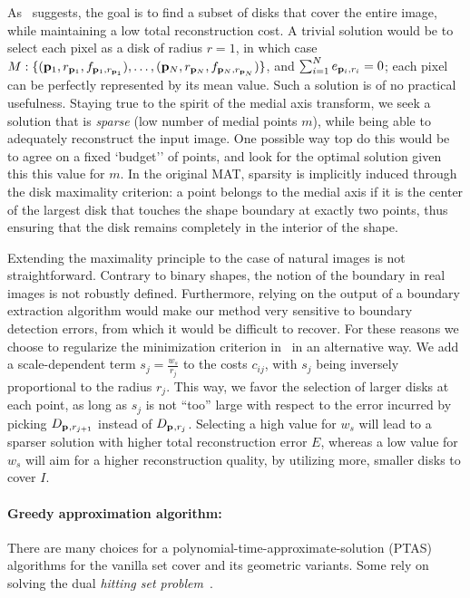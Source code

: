 \documentclass[10pt,twocolumn,letterpaper]{article}
\begin{document}
As~ suggests, the goal is to find a subset of disks that cover the entire image, while maintaining
a low total reconstruction cost. 
A trivial solution would be to select each pixel as a disk of radius $r=1$, in which case
$M:\{ (\mathbf{p}_{1},r_{\mathbf{p}_{1}},f_{\mathbf{p}_{1},r_{\mathbf{p}_{1}}}), \ldots, ( \mathbf{p}_{N},r_{\mathbf{p}_{N}},f_{\mathbf{p}_{N},r_{\mathbf{p}_{N}}} ) \}$,
and $\sum_{i=1}^N e_{\mathbf{p}_{i},r_i} = 0$; each pixel can be perfectly represented by its mean value.
Such a solution is of no practical usefulness. 
Staying true to the spirit of the medial axis transform, we seek a solution that is \emph{sparse}
(low number of medial points $m$), while being able to adequately reconstruct the input image.
One possible way top do this would be to agree on a fixed `budget'' of points, and look for the 
optimal solution given this this value for $m$.
In the original MAT, sparsity is implicitly induced through the disk maximality criterion:
a point belongs to the medial axis if it is the center of the largest disk that touches 
the shape boundary at exactly two points, thus ensuring that the disk remains completely in the 
interior of the shape.

Extending the maximality principle to the case of natural images is not straightforward.
Contrary to binary shapes, the notion of the boundary in real images is not robustly defined.
Furthermore, relying on the output of a boundary extraction algorithm would make our method very sensitive
to boundary detection errors, from which it would be difficult to recover.
For these reasons we choose to regularize the minimization criterion in~ in an alternative way. 
We add a scale-dependent term $s_j = \frac{w_s}{r_j}$ to the costs $c_{ij}$, with $s_j$ 
being inversely proportional to the radius $r_j$.
This way, we favor the selection of larger disks at each point, as long as $s_j$ is not ``too'' large
with respect to the error incurred by picking $D_{\mathbf{p}_{},r_{j+1}}$ instead of $D_{\mathbf{p}_{},r_j}$.
Selecting a high value for $w_s$ will lead to a sparser solution with higher total reconstruction error $E$,
whereas a low value for $w_s$ will aim for a higher reconstruction quality, by utilizing more, smaller disks
to cover $I$.

\paragraph{Greedy approximation algorithm:}
There are many choices for a polynomial-time-approximate-solution (PTAS) algorithms for the vanilla set cover
and its geometric variants.
Some rely on solving the dual \emph{hitting set problem}~\cite{bronnimann1995almost}.
\end{document}
